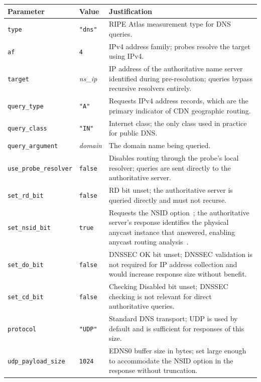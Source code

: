 \begin{table}[H]
\centering
\small
\begin{tabularx}{\linewidth}{l l X}
\toprule
\textbf{Parameter} & \textbf{Value} & \textbf{Justification} \\
\midrule
\texttt{type} & \texttt{"dns"} & RIPE Atlas measurement type for \ac{DNS} queries. \\
\texttt{af} & \texttt{4} & \ac{IPv4} address family; probes resolve the target using \ac{IPv4}. \\
\texttt{target} & \textit{ns\_ip} & \ac{IP} address of the authoritative name server identified during pre-resolution; queries bypass recursive resolvers entirely. \\
\texttt{query\_type} & \texttt{"A"} & Requests \ac{IPv4} address records, which are the primary indicator of \ac{CDN} geographic routing. \\
\texttt{query\_class} & \texttt{"IN"} & Internet class; the only class used in practice for public \ac{DNS}. \\
\texttt{query\_argument} & \textit{domain} & The domain name being queried. \\
\texttt{use\_probe\_resolver} & \texttt{false} & Disables routing through the probe's local resolver; queries are sent directly to the authoritative server. \\
\texttt{set\_rd\_bit} & \texttt{false} & \ac{RD} bit unset; the authoritative server is queried directly and must not recurse. \\
\texttt{set\_nsid\_bit} & \texttt{true} & Requests the \ac{NSID} option~\cite{RFC5001}; the authoritative server's response identifies the physical anycast instance that answered, enabling anycast routing analysis~\cite{Bortzmeyer2013,Finnegan2018}. \\
\texttt{set\_do\_bit} & \texttt{false} & \ac{DNSSEC} OK bit unset; \ac{DNSSEC} validation is not required for \ac{IP} address collection and would increase response size without benefit. \\
\texttt{set\_cd\_bit} & \texttt{false} & Checking Disabled bit unset; \ac{DNSSEC} checking is not relevant for direct authoritative queries. \\
\texttt{protocol} & \texttt{"UDP"} & Standard \ac{DNS} transport; UDP is used by default and is sufficient for responses of this size. \\
\texttt{udp\_payload\_size} & \texttt{1024} & EDNS0 buffer size in bytes; set large enough to accommodate the \ac{NSID} option in the response without truncation. \\

\end{tabularx}
\end{table}
